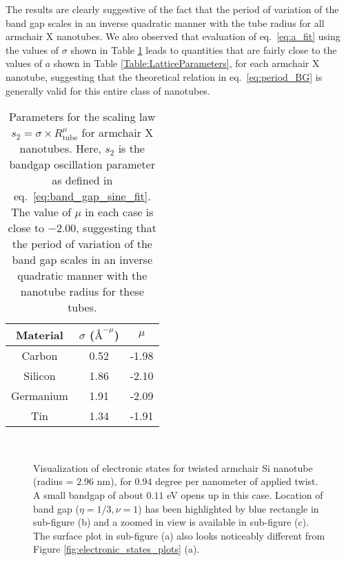 \documentclass[preprint,12pt, 3p, sort&compress]{elsarticle}
\begin{document}
The results are clearly suggestive of the fact that the period of variation of the band gap scales in an inverse quadratic manner with the tube radius for all armchair X nanotubes. We also observed that evaluation of eq.~\ref{eq:a_fit} using the values of $\sigma$ shown in Table \ref{Table:s2_scaling} leads to quantities that are fairly close to the values of $a$ shown in Table \ref{Table:LatticeParameters}, for each armchair X nanotube, suggesting that the theoretical relation in eq.~\ref{eq:period_BG} is generally valid for this entire class of nanotubes.
\begin{table}[ht]
\centering
\begin{tabular}{c  c  c}
\hline
Material & $\sigma$ ($\text{\AA}^{-\mu}$) & $\mu$  \\   
\hline
Carbon  & 0.52 &  -1.98 \\
Silicon  &  1.86 & -2.10  \\
Germanium & 1.91 & -2.09 \\
Tin  & 1.34 & -1.91 \\
\hline
\end{tabular}
\caption{Parameters for the scaling law $s_2 = \sigma \times R_{\text{tube}}^{\mu}$ for armchair X nanotubes. Here, $s_2$ is the bandgap oscillation parameter as defined in eq.~\ref{eq:band_gap_sine_fit}. The value of $\mu$ in each case is close to $-2.00$, suggesting that the period of variation of the band gap scales in an inverse quadratic manner with the nanotube radius for these tubes.}
\label{Table:s2_scaling}
\end{table} 
\begin{figure}[!ht]
\centering
{}\\
\quad
{}
\caption{Visualization of electronic states for twisted armchair Si nanotube (radius = $2.96$ nm), for $0.94$ degree per nanometer of applied twist. A small bandgap of about $0.11$ eV opens up in this case. Location of band gap ($\eta = 1/3, \nu = 1$) has been highlighted by blue rectangle in sub-figure (b) and a zoomed in view is available in sub-figure (c). The surface plot in sub-figure (a) also looks noticeably different from Figure \ref{fig:electronic_states_plots} (a).}
\label{fig:electronic_states_plots_again}
\end{figure}
               
\end{document}
